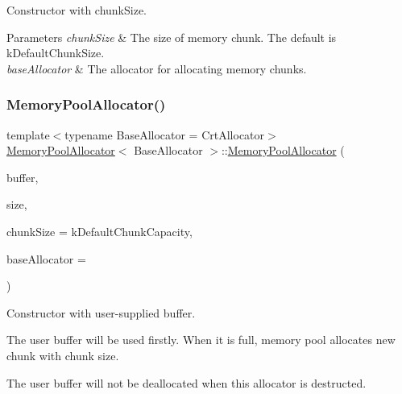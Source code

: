 Constructor with chunk\+Size. 


\begin{DoxyParams}{Parameters}
{\em chunk\+Size} & The size of memory chunk. The default is k\+Default\+Chunk\+Size. \\
\hline
{\em base\+Allocator} & The allocator for allocating memory chunks. \\
\hline
\end{DoxyParams}
\mbox{\label{classMemoryPoolAllocator_a1f0d865093fdb955d956b7a445a8ddbf}} 
\subsubsection{\texorpdfstring{Memory\+Pool\+Allocator()}{MemoryPoolAllocator()}\hspace{0.1cm}{\footnotesize\ttfamily [2/4]}}
{\footnotesize\ttfamily template$<$typename Base\+Allocator = Crt\+Allocator$>$ \\
\hyperlink{classMemoryPoolAllocator}{Memory\+Pool\+Allocator}$<$ Base\+Allocator $>$\+::\hyperlink{classMemoryPoolAllocator}{Memory\+Pool\+Allocator} (\begin{DoxyParamCaption}\item[{void $\ast$}]{buffer,  }\item[{size\+\_\+t}]{size,  }\item[{size\+\_\+t}]{chunk\+Size = {\ttfamily kDefaultChunkCapacity},  }\item[{Base\+Allocator $\ast$}]{base\+Allocator = {} }\end{DoxyParamCaption})\hspace{0.3cm}{\ttfamily [inline]}}



Constructor with user-\/supplied buffer. 

The user buffer will be used firstly. When it is full, memory pool allocates new chunk with chunk size.

The user buffer will not be deallocated when this allocator is destructed.


